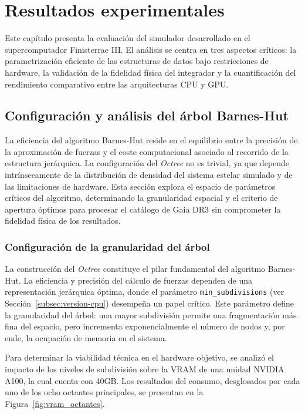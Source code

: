 \chapter{Resultados experimentales}
\label{chap:resultados}
Este capítulo presenta la evaluación del simulador desarrollado en el supercomputador Finisterrae III.
El análisis se centra en tres aspectos críticos: la parametrización eficiente de las estructuras de datos bajo restricciones de hardware, la validación de la fidelidad física del integrador y la cuantificación del rendimiento comparativo entre las arquitecturas CPU y GPU.

\section{Configuración y análisis del árbol Barnes-Hut}\label{sec:configuracion-y-analisis-del-arbol-barnes-hut}

La eficiencia del algoritmo Barnes-Hut reside en el equilibrio entre la precisión de la aproximación de fuerzas y el coste computacional asociado al recorrido de la estructura jerárquica.
La configuración del \textit{Octree} no es trivial, ya que depende intrínsecamente de la distribución de densidad del sistema estelar simulado y de las limitaciones de hardware.
Esta sección explora el espacio de parámetros críticos del algoritmo, determinando la granularidad espacial y el criterio de apertura óptimos para procesar el catálogo de Gaia DR3 sin comprometer la fidelidad física de los resultados.

\subsection{Configuración de la granularidad del árbol}\label{subsec:eleccion-de-la-granularidad-del-arbol}
La construcción del \textit{Octree} constituye el pilar fundamental del algoritmo Barnes-Hut.
La eficiencia y precisión del cálculo de fuerzas dependen de una representación jerárquica óptima, donde el parámetro \texttt{min\_subdivisions} (ver Sección~\ref{subsec:version-cpu}) desempeña un papel crítico.
Este parámetro define la granularidad del árbol: una mayor subdivisión permite una fragmentación más fina del espacio, pero incrementa exponencialmente el número de nodos y, por ende, la ocupación de memoria en el sistema.

Para determinar la viabilidad técnica en el hardware objetivo, se analizó el impacto de los niveles de subdivisión sobre la VRAM de una unidad NVIDIA A100, la cual cuenta con 40GB.
Los resultados del consumo, desglosados por cada uno de los ocho octantes principales, se presentan en la Figura~\ref{fig:vram_octantes}.

